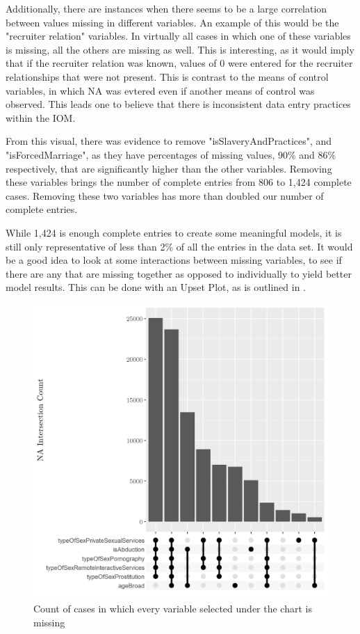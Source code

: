 \documentclass{article} %
\begin{document}
Additionally, there are instances when there seems to be a large correlation between values missing in different variables. An example of this would be the "recruiter relation" variables. In virtually all cases in which one of these variables is missing, all the others are missing as well. This is interesting, as it would imply that if the recruiter relation was known, values of 0 were entered for the recruiter relationships that were not present. This is contrast to the means of control variables, in which NA was evtered even if another means of control was observed. This leads one to believe that there is inconsistent data entry practices within the IOM.

From this visual, there was evidence to remove "isSlaveryAndPractices", and "isForcedMarriage", as they have percentages of missing values, 90\% and 86\% respectively, that are significantly higher than the other variables. Removing these variables brings the number of complete entries from 806 to 1,424 complete cases. Removing these two variables has more than doubled our number of complete entries.

While 1,424 is enough complete entries to create some meaningful models, it is still only representative of less than 2\% of all the entries in the data set. It would be a good idea to look at some interactions between missing variables, to see if there are any that are missing together as opposed to individually to yield better model results. This can be done with an Upset Plot, as is outlined in \cite{UpsetPlot}.

\begin{figure}[H]
	\includegraphics[width = \textwidth]{UpsetPlt1}
	\caption{Count of cases in which every variable selected under the chart is missing}
	\label{fig:IntersectionCount}
\end{figure}
\end{document}
